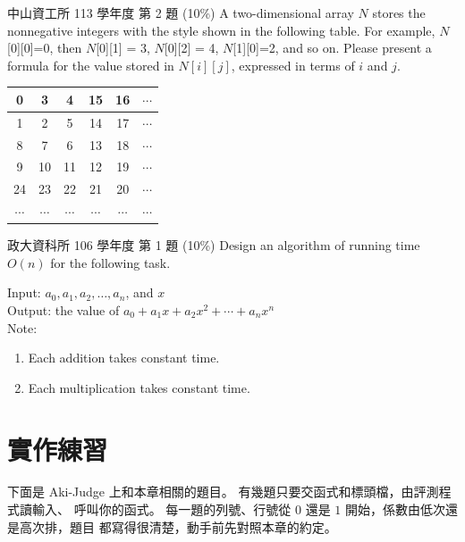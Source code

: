 \begin{pastexam}[label={px:arr-4}]{中山資工所 113 學年度 第 2 題}
(10\%) A two-dimensional array $N$ stores the nonnegative integers with the style shown in
the following table. For example, $N$[0][0]=0, then $N$[0][1] = 3, $N$[0][2] = 4,
$N$[1][0]=2, and so on. Please present a formula for the value stored in $N[i][j]$,
expressed in terms of $i$ and $j$.
\begin{center}
\begin{tabular}{|c|c|c|c|c|c|}\hline
0 & 3 & 4 & 15 & 16 & $\cdots$\\\hline
1 & 2 & 5 & 14 & 17 & $\cdots$\\\hline
8 & 7 & 6 & 13 & 18 & $\cdots$\\\hline
9 & 10 & 11 & 12 & 19 & $\cdots$\\\hline
24 & 23 & 22 & 21 & 20 & $\cdots$\\\hline
$\cdots$ & $\cdots$ & $\cdots$ & $\cdots$ & $\cdots$ & $\cdots$\\\hline
\end{tabular}
\end{center}
\end{pastexam}

\begin{pastexam}[label={px:arr-5}]{政大資科所 106 學年度 第 1 題}
(10\%) Design an algorithm of running time $O(n)$ for the following task.

\hspace*{1.5em}Input: $a_0,a_1,a_2,\ldots,a_n$, and $x$\\
\hspace*{1.5em}Output: the value of $a_0+a_1x+a_2x^2+\cdots+a_nx^n$\\
\hspace*{1.5em}Note:
\begin{enumerate}[label=\Alph*.,leftmargin=4em]
\item Each addition takes constant time.
\item Each multiplication takes constant time.
\end{enumerate}
\end{pastexam}

\section{實作練習}
\label{sec:arr-practice}

下面是 Aki-Judge 上和本章相關的題目。 有幾題只要交函式和標頭檔，由評測程式讀輸入、
呼叫你的函式。 每一題的列號、行號從 $0$ 還是 $1$ 開始，係數由低次還是高次排，題目
都寫得很清楚，動手前先對照本章的約定。

